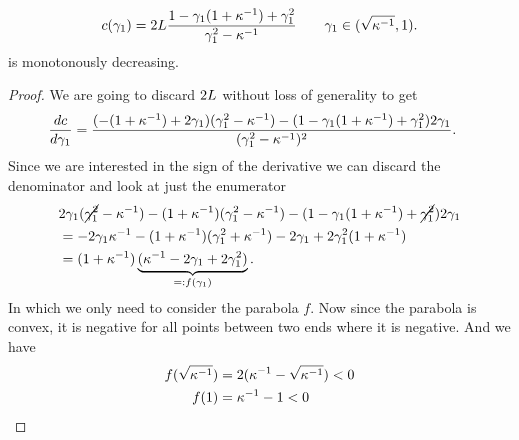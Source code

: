 \begin{lemma}\label{lem-appendix: derivative loss difference constant in gamma}
	\begin{align*}
		c(\gamma_1)
		=2L\frac{1-\gamma_1(1+\kappa^{-1}) + \gamma_1^2}{\gamma_1^2 -\kappa^{-1}}
		\qquad \gamma_1\in(\sqrt{\kappa^{-1}}, 1).
	\end{align*}
	is monotonously decreasing.
\end{lemma}
\begin{proof}
	We are going to discard \(2L\) without loss of generality to get	
	\begin{align*}
		\frac{dc}{d\gamma_1}
		&= \frac{
			(-(1+\kappa^{-1})+2\gamma_1)(\gamma_1^2 -\kappa^{-1})
			- (1-\gamma_1(1+\kappa^{-1})+\gamma_1^2)2\gamma_1
		}{(\gamma_1^2-\kappa^{-1})^2}.
	\end{align*}
	Since we are interested in the sign of the derivative we can discard the
	denominator and look at just the enumerator
	\begin{align*}
		&2\gamma_1(\cancel{\gamma_1^2}-\kappa^{-1}) - (1+\kappa^{-1})(\gamma_1^2-\kappa^{-1})
		- (1-\gamma_1(1+\kappa^{-1})+\cancel{\gamma_1^2})2\gamma_1\\
		&= -2\gamma_1\kappa^{-1} - (1+\kappa^{-1})(\gamma_1^2 + \kappa^{-1})
		-2\gamma_1 + 2\gamma_1^2(1+\kappa^{-1})\\
		&= (1+\kappa^{-1})\underbrace{(\kappa^{-1}-2\gamma_1 + 2\gamma_1^2)}_{=:f(\gamma_1)}.
	\end{align*}
	In which we only need to consider the parabola \(f\). Now since the parabola
	is convex, it is negative for all points between two ends where it
	is negative. And we have
	\begin{align*}
		f(\sqrt{\kappa^{-1}}) &= 2(\kappa^{-1}-\sqrt{\kappa^{-1}}) < 0\\
		f(1) &= \kappa^{-1} -1 < 0
		\qedhere
	\end{align*}
\end{proof}


\endinput